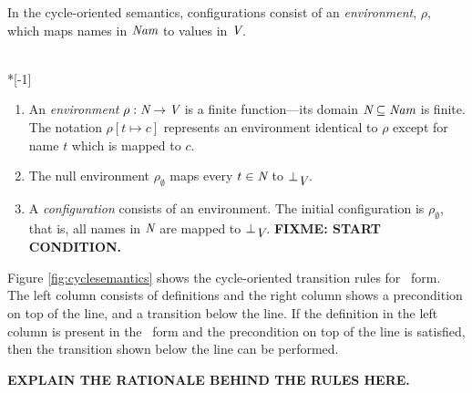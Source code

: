 \documentclass[12pt,notitlepage]{article}
\begin{document}
In the cycle-oriented semantics, configurations consist of an
\emph{environment}, $\rho$, which maps
names in ${\mbox{\em Nam}}$ to values in ${\mbox{\em V}}$.

\begin{definition}~\\*[-1\baselineskip]
\begin{enumerate}
\item An \emph{environment} $\rho: {\mbox{\em N}} \to {\mbox{\em V}}$ is a
finite function---its domain ${\mbox{\em N}} \subseteq {\mbox{\em Nam}}$ is
finite.  The notation $\rho[t\mapsto c]$ represents an environment
identical to $\rho$ except for name $t$ which is mapped to $c$.
\item The null environment $\rho_\emptyset$ maps every $t\in{\mbox{\em N}}$ to
$\bot_{\mbox{\em V}}$.
\item A \emph{configuration} consists of an environment.  The initial
configuration is $\rho_\emptyset$, that is, all names in ${\mbox{\em N}}$
are mapped to $\bot_{\mbox{\em V}}$. \textbf{FIXME: START CONDITION.}
\end{enumerate}
\end{definition}

Figure \ref{fig:cyclesemantics} shows the cycle-oriented transition
rules for \ssiplus\ form.  The left column consists of definitions and
the right column shows a precondition on top of the line, and a
transition below the line.  If the definition in the left column is
present in the \ssiplus\ form and the precondition on top of the line
is satisfied, then the transition shown below the line can be performed.

\textbf{EXPLAIN THE RATIONALE BEHIND THE RULES HERE.}
\end{document}
